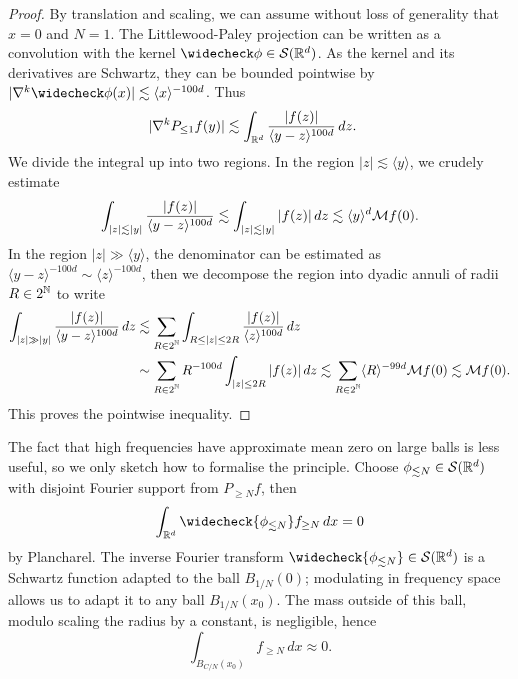 \begin{proof}
	By translation and scaling, we can assume without loss of generality that $x = 0$ and $N = 1$. The Littlewood-Paley projection can be written as a convolution with the kernel $\widecheck \phi \in \cS (\R^d)$. As the kernel and its derivatives are Schwartz, they can be bounded pointwise by $|\nabla^k \widecheck \phi (x)| \lesssim \langle x \rangle^{-100d}$. Thus
		\begin{align*}
			 |\nabla^k P_{\leq 1} f (y)|
			 	&\lesssim \int_{\mathbb R^d} \frac{|f(z)|}{\langle  y - z \rangle^{100d}} \, dz.
		\end{align*}	
	We divide the integral up into two regions. In the region $|z| \lesssim \langle y\rangle$, we crudely estimate
		\begin{align*}
			\int_{|z| \lesssim |y|}  \frac{|f(z)|}{\langle  y - z \rangle^{100d}} \lesssim \int_{|z| \lesssim |y|} |f(z)| \, dz \lesssim \langle y \rangle^d \mathcal M f(0).
		\end{align*}
	In the region $|z| \gg \langle y\rangle$, the denominator can be estimated as $\langle y - z \rangle^{-100d} \sim \langle z \rangle^{-100d}$, then we decompose the region into dyadic annuli of radii $R \in 2^\mathbb N$ to write	
		\begin{align*}
			\int_{|z| \gg |y|} \frac{|f(z)|}{\langle  y - z \rangle^{100d}} \, dz
						&\lesssim \sum_{\substack{R \in 2^\mathbb N}} \int_{R \leq |z| \leq 2R} \frac{|f(z)|}{\langle z \rangle^{100d}} \, dz \\
						&\sim \sum_{\substack{R \in 2^\mathbb N}} R^{-100d}\int_{|z| \leq 2R} |f(z)| \, dz\lesssim \sum_{\substack{R \in 2^\mathbb N}} \langle R \rangle^{-99d} \mathcal M f(0) \lesssim \mathcal M f(0).
				\end{align*}
	This proves the pointwise inequality. 
\end{proof}

The fact that high frequencies have approximate mean zero on large balls is less useful, so we only sketch how to formalise the principle. Choose $\phi_{\lesssim N} \in \mathcal S (\mathbb R^d)$ with disjoint Fourier support from $P_{\geq N} f$, then 
	\[ \int_{\R^d} \widecheck{\phi_{\lesssim N}} f_{\geq N} \, dx = 0 \]
by Plancharel. The inverse Fourier transform $\widecheck{\phi_{\lesssim N}} \in \cS (\R^d)$ is a Schwartz function adapted to the ball $B_{1/N} (0)$; modulating in frequency space allows us to adapt it to any ball $B_{1/N} (x_0)$. The mass outside of this ball, modulo scaling the radius by a constant, is negligible, hence
	\[ \int_{B_{C/N} (x_0)} f_{\geq N} \, dx \approx 0. \]


